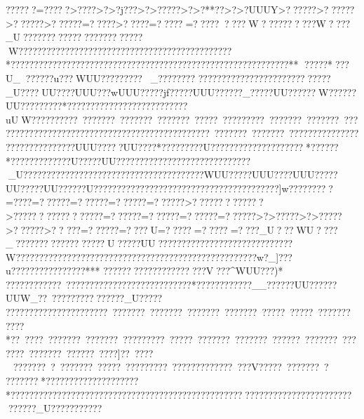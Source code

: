 {{{{{{{{{{{{{{{{{{{{{{{{{{{{{{{{{{{{{{{{{{{{{{{{{{{{{{{{{{{{{{{{{{{{{{{{{{{{{{{{{{{{{{{{{{{{{{{{{{{{{{{{{{{{{{{{{{{{{{{{{{{{{{{{{{{{{{{{{{{{{{{{{{{{{{{{{{{{{{{{{{{{{{{{{{{{{{{{{{{{{{{{{{{{{{{{{{{{{{{{{{{{{{{{{{{{{{{{{{{{{{{{{{{{{{{{{{{{{{{{{{{{{{{{{{{{{{{{{{{{{{{{{{{{{{{{{{{{{{{{{{{{{{{{{{{{{{{{{{{{{{{{{{{{{{{{{{{{{{{{{{{{{{{{{{{{{{{{{{{{{{{{{{{{{{{{{{{{{{{{{{{{{{{{{{{{{{{{{{{{{{{{{{{{{{{{{{{{{{{{{{{{{{{{{{{{{{{{{{{{{{{{{{{{{{{{{{{{{{{{{{{{{{{{{{{{{{{{{{{{{{{{{{{{{{{{{{{{{{{{{{{{{{{{{{{{{{{{{{{{{{{{{{{{{{{{{{{{{{{{{{{{{{{{{{{{{{{{{{{{{{{{{{{{{{{{{{{{{{{{{{{{{{{{{{{{{{{{{{{{{{{{{{{{{{{{{{{{{{{{{{{{{{{{{{{{{{{{{{{{{{{{{{{{{{{{{{{{{{{{{{{{{{{{{{{{{{{{{{{{{{{{{{{{{{{{{{{{{{{{{{{{{{{{{{{{{{{{{{{{{{{{{{{{{{{{{{{{{{{{{{{{{{{{{{{{{{{{{{{{{{{{{{{{{{{{{{{{{{{{{{{{{{{{{{{{{{{{{{{{{{{{{{{{{{{{{{{{{{{{{{{{{{{{{{{{{{{{{{{{{{{{{{{{{{{{{{{{{{{{{{{{{{{{{{{{{{{{{{{{{{{{{{{{{{{{{{{{{{{{{{{{{{{{{{{{{{{{{{{{{{{{{{{{{{{{{{{{{{{{{{{{{{{{{{{{{{{{{{{{{{{{{{{{{{{{{{{{{{{{{{{{{{{{{{{{{{{{{{{{{{{{{{{{{{{{{{{{{{{{{{{{{{{{{{{{{{{{{{{{{{{{{{{{{{{{{{{{{{{{{{{{{{{{{{{{{{{{{{{{{{{{{{{{{{{{{{{{{{{{{{{{{{{{{{{{{{{{{{{{{{{{{{{{{{{{{{{{{{{{{{{{{{{{{{{{{{{{{{{{{{{{{{{{{{{{{{{{{{{{{{{{{{{{{{{{{{{{{{{{{{{{{{{{{{{{{{{{{{{{{{{{{{{{{{{{{{{{{{{{{{{{{{{{{{{{{{{{{{{{{{{{{{{{{{{{{{{{{{{{{{{{{{{{{{{{{{{{{{{{{{{{{{{{{{{{{??????=?????>????>?>?j???>?>?????>?>?**??>?>?UUUY>??????>??????>??????>??????=?????>?? ???=?????=?????????W???????? ??W????_U??????????  ??????????????W??????????????????????????????????????????????*????????????????????????????????????????????????????????????**
?????*???U_??????u???WUU?????????_???  ?????
????????????????????????????_U????UU????UUU???wUUU?????jf?????UUU??????_?????UU??????W??????UU????   ?????  *?????  ?????? ???????????????uUW??????????~???????~???????~???????~?????~?????????~???????~???????~???????????????????????????????????????????????~???????~???????~????????? ????????????????   ?????UUU?????UU???? *?????????U????????????????????*??????
*????????  ?????}U?????UU?????????????????????????????_U????  ??????????????????????????????    ?????WUU?????UUU????UUU?????UU?????UU??????U????????????????????????????????????????]w?????????=????=??????=??????=??????=??????>?????????????>?????????????????=??????=??????=??????=??????>?>?????>?>?????>??????>??
???=??????=????U=?????=?????=????_U???WU?? ??_?????????? ????????U?????UU??????????????????? ??????????W????????????????????????????????????????????????????w?_]???u????????????????***
?????????????????????V  ???^WUU???)*
????????????~???????????????????????????*????????????__??????UU??????UUW_??~?  ?????? ????????_U?????  ?????   ?????  ????????????~???????~???????~???????~???????~?????~?????~???????~????*??~???? ~???????~???????~?????????~?????~???????~???????~??????~???????~???????~???????~??????~????]??~????~???????~?~???????~?????~?????????~?????????????~???V?????~???????~?
???????  *????????????????????*???????????????????????????????????????????????????????????????????????????????_U???? ??????? }}}}}}}}}}}}}}}}}}}}}}}}}}}}}}}}}}}}}}}}}}}}}}}}}}}}}}}}}}}}}}}}}}}}}}}}}}}}}}}}}}}}}}}}}}}}}}}}}}}}}}}}}}}}}}}}}}}}}}}}}}}}}}}}}}}}}}}}}}}}}}}}}}}}}}}}}}}}}}}}}}}}}}}}}}}}}}}}}}}}}}}}}}}}}}}}}}}}}}}}}}}}}}}}}}}}}}}}}}}}}}}}}}}}}}}}}}}}}}}}}}}}}}}}}}}}}}}}}}}}}}}}}}}}}}}}}}}}}}}}}}}}}}}}}}}}}}}}}}}}}}}}}}}}}}}}}}}}}}}}}}}}}}}}}}}}}}}}}}}}}}}}}}}}}}}}}}}}}}}}}}}}}}}}}}}}}}}}}}}}}}}}}}}}}}}}}}}}}}}}}}}}}}}}}}}}}}}}}}}}}}}}}}}}}}}}}}}}}}}}}}}}}}}}}}}}}}}}}}}}}}}}}}}}}}}}}}}}}}}}}}}}}}}}}}}}}}}}}}}}}}}}}}}}}}}}}}}}}}}}}}}}}}}}}}}}}}}}}}}}}}}}}}}}}}}}}}}}}}}}}}}}}}}}}}}}}}}}}}}}}}}}}}}}}}}}}}}}}}}}}}}}}}}}}}}}}}}}}}}}}}}}}}}}}}}}}}}}}}}}}}}}}}}}}}}}}}}}}}}}}}}}}}}}}}}}}}}}}}}}}}}}}}}}}}}}}}}}}}}}}}}}}}}}}}}}}}}}}}}}}}}}}}}}}}}}}}}}}}}}}}}}}}}}}}}}}}}}}}}}}}}}}}}}}}}}}}}}}}}}}}}}}}}}}}}}}}}}}}}}}}}}}}}}}}}}}}}}}}}}}}}}}}}}}}}}}}}}}}}}}}}}}}}}}}}}}}}}}}}}}}}}}}}}}}}}}}}}}}}}}}}}}}}}}}}}}}}}}}}}}}}}}}}}}}}}}}}}}}}}}}}}}}}}}}}}}}}}}}}}}}}}}}}}}}}}}}}}}}}}}}}}}}}}}}}}}}}}}}}}}}}}}}}}}}}}}}}}}}}}}}}}}}}}}}}}}}}}}}}}}}}}}}}}}}}}}}}}}}}}}}}}}}}}}}}}}}}}}}}}}}}}}}}}}}}}}}}}}}}}}}}}}}}}}}}}}}}}}}}}}}}}}}}}}}}}}}}}}}}}}}}}}}}}}}}}}}}}}}}}}}}}}}}}}}}}}}}}}}}}}}}}}}}}}}}}}}}}}}}}}}}}}}}}}}}}}}}}}}}}}}}}}}}}}}}}}}}}}}}}}}}}}}}}}}}}}}}}}}}}}}}}}}}}}}}}}}}}}}}}}}}}}}}}}}}}}}}}}}}}}}}}}}}}}}}}
